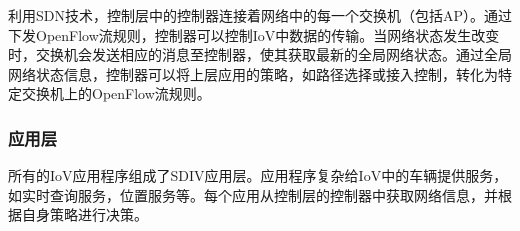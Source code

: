 \documentclass{ctexart}
\begin{document}
利用SDN技术，控制层中的控制器连接着网络中的每一个交换机（包括AP）。通过下发OpenFlow流规则，控制器可以控制IoV中数据的传输。当网络状态发生改变时，交换机会发送相应的消息至控制器，使其获取最新的全局网络状态。通过全局网络状态信息，控制器可以将上层应用的策略，如路径选择或接入控制，转化为特定交换机上的OpenFlow流规则。


\subsubsection{应用层}

所有的IoV应用程序组成了SDIV应用层。应用程序复杂给IoV中的车辆提供服务，如实时查询服务，位置服务等。每个应用从控制层的控制器中获取网络信息，并根据自身策略进行决策。
%
%
\end{document}
